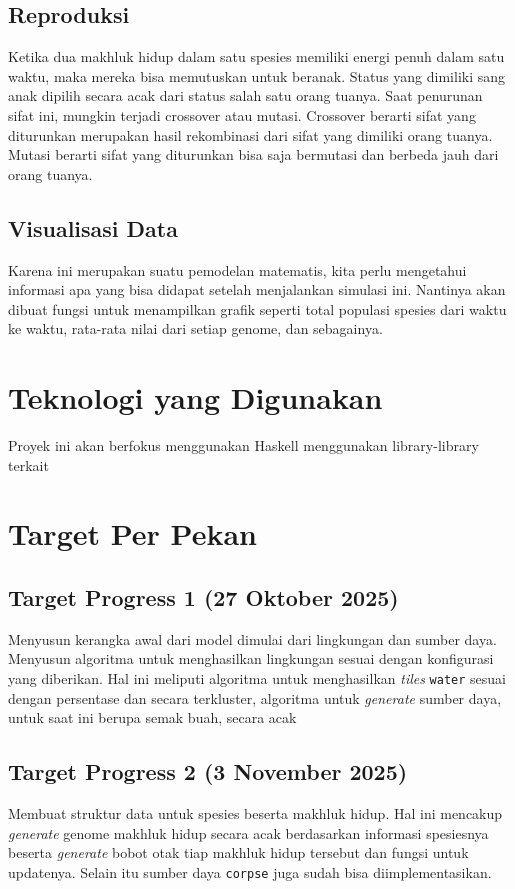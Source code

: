 \documentclass[12pt]{article}
\begin{document}
\subsection{Reproduksi}
Ketika dua makhluk hidup dalam satu spesies memiliki energi penuh dalam satu waktu, maka mereka bisa memutuskan untuk beranak. Status yang dimiliki sang anak dipilih secara acak dari status salah satu orang tuanya. Saat penurunan sifat ini, mungkin terjadi crossover atau mutasi. Crossover berarti sifat yang diturunkan merupakan hasil rekombinasi dari sifat yang dimiliki orang tuanya. Mutasi berarti sifat yang diturunkan bisa saja bermutasi dan berbeda jauh dari orang tuanya.
\subsection{Visualisasi Data}
Karena ini merupakan suatu pemodelan matematis, kita perlu mengetahui informasi apa yang bisa didapat setelah menjalankan simulasi ini. Nantinya akan dibuat fungsi untuk menampilkan grafik seperti total populasi spesies dari waktu ke waktu, rata-rata nilai dari setiap genome, dan sebagainya.
\section{Teknologi yang Digunakan}
Proyek ini akan berfokus menggunakan Haskell menggunakan library-library terkait
\section{Target Per Pekan}
\subsection{Target Progress 1 (27 Oktober 2025)}
Menyusun kerangka awal dari model dimulai dari lingkungan dan sumber daya. Menyusun algoritma untuk menghasilkan lingkungan sesuai dengan konfigurasi yang diberikan. Hal ini meliputi algoritma untuk menghasilkan \textit{tiles} \texttt{water} sesuai dengan persentase dan secara terkluster, algoritma untuk \textit{generate} sumber daya, untuk saat ini berupa semak buah, secara acak
\subsection{Target Progress 2 (3 November 2025)}
Membuat struktur data untuk spesies beserta makhluk hidup. Hal ini mencakup \textit{generate} genome makhluk hidup secara acak berdasarkan informasi spesiesnya beserta \textit{generate} bobot otak tiap makhluk hidup tersebut dan fungsi untuk updatenya. Selain itu sumber daya \texttt{corpse} juga sudah bisa diimplementasikan.
\end{document}
